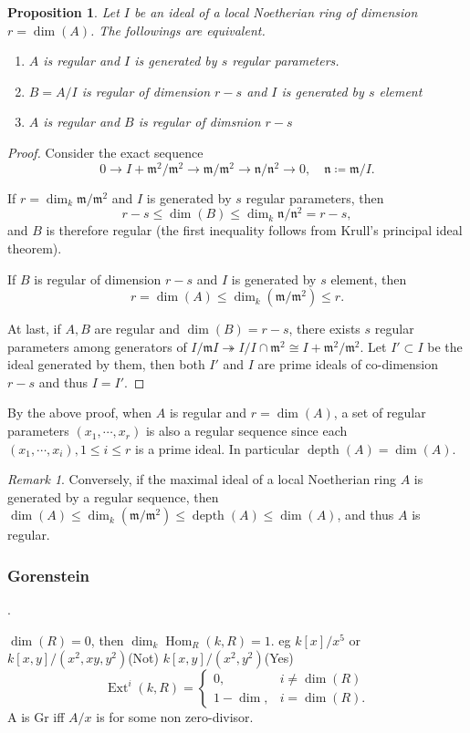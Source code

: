 \documentclass[leqno]{amsart}
\DeclareMathOperator{\depth}{depth}
\newcommand{\1}{\mathbf{1}}
\newcommand{\fm}{\mathfrak m}
\newcommand{\fn}{\mathfrak n}
\DeclareMathOperator{\Ext}{Ext}
\DeclareMathOperator{\Hom}{Hom}
\newtheorem{prop}[thm]{Proposition}
\theoremstyle{definition}
\theoremstyle{remark}
\newtheorem{rem}[thm]{Remark}
\begin{document}
\begin{prop}
	Let  $I$ be an ideal of a local Noetherian ring 
	of dimension  $r=\dim(A)$.
	The followings are equivalent.
\begin{enumerate}[label=(\alph*)]
	\item 
	$A$ is regular and 
	$I$ is generated by $s$ regular parameters.
	\item  
	$B=A/I$ is regular of dimension  $r-s$
	and $I$ is generated by  $s$ element
	\item  
	$A$ is regular and  $B$ is regular of dimsnion  $r-s$
\end{enumerate}
\end{prop}
\begin{proof}
	Consider the exact sequence
	\[
		0\to I+\fm^2/\fm^2\to \fm/\fm^2\to \fn/\fn^2\to 0,\quad
		\fn\coloneqq \fm/I.
	\]
	
	If  $r=\dim_k\fm/\fm^2$ and 
	$I$ is generated by $s$ regular parameters, then
	\[
		r-s\leq \dim(B)\leq \dim_k \fn/\fn^2=r-s,
	\]
	and $B$ is therefore regular
	(the first inequality follows from Krull's principal
	ideal theorem).

	If $B$ is regular of dimension  $r-s$
	and $I$ is generated by  $s$ element, then
	\[
		r=\dim(A)\leq \dim_k(\fm/\fm^2)\leq r.
	\]

	At last, if $A, B$ are regular and $\dim(B)=r-s$,
	there exists $s$ regular parameters among generators of
	$I/\fm I\twoheadrightarrow I/I\cap \fm^2\cong I+\fm^2/\fm^2$.
	Let $I'\subset I$ be the ideal generated by them,
	then both $I'$ and  $I$ are prime ideals 
	of co-dimension  $r-s$ and thus  $I=I'$.
\end{proof}
By the above proof, when $A$ is regular and  $r=\dim(A)$,
a set of regular parameters  $(x_1,\cdots,x_r)$
is also a regular sequence since each 
$(x_1,\cdots,x_i), 1\leq i\leq r$ is a prime ideal.
In particular $\depth(A)=\dim(A)$.
\begin{rem}
Conversely, if the maximal ideal of a local Noetherian ring $A$	
is generated by a regular sequence, then
$\dim(A)\leq \dim_k(\fm/\fm^2)\leq \depth(A)\leq \dim(A)$,
and thus  $A$ is regular.
\end{rem}

\subsubsection{Gorenstein}.

$\dim(R)=0$, then  $\dim_k\Hom_R(k,R)=1$.
eg $k[x]/x^5$ or 
$k[x,y]/(x^2,xy,y^2)$(Not)
$k[x,y]/(x^2,y^2)$(Yes)
 \[
	 \Ext^i(k,R)=\begin{cases}
		 0, & i\neq\dim(R)\\
		 1-\dim, & i=\dim(R).
	 \end{cases}
\]
A is Gr iff $A/x$ is for some non zero-divisor.
\end{document}
